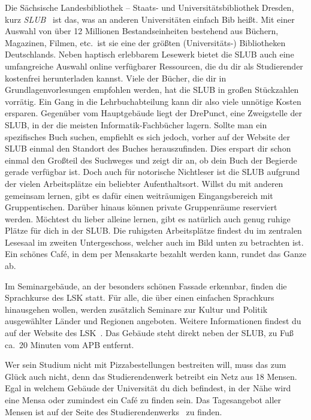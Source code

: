 \label{sec:slub}
Die Sächsische Landesbibliothek – Staats- und Universitätsbibliothek Dresden, kurz \emph{SLUB}~ ist das, was an anderen Universitäten einfach Bib heißt.
Mit einer Auswahl von über 12 Millionen Bestandseinheiten bestehend aus Büchern, Magazinen, Filmen, etc.\ ist sie eine der größten (Universitäts-) Bibliotheken Deutschlands.
Neben haptisch erlebbarem Lesewerk bietet die SLUB auch eine umfangreiche Auswahl online verfügbarer Ressourcen, die du dir als Studierender kostenfrei herunterladen kannst.
Viele der Bücher, die dir in Grundlagenvorlesungen empfohlen werden, hat die SLUB in großen Stückzahlen vorrätig. Ein Gang in die Lehrbuchabteilung kann dir also viele unnötige Kosten ersparen.
Gegenüber vom Hauptgebäude liegt der DrePunct, eine Zweigstelle der SLUB, in der die meisten Informatik-Fachbücher lagern. Sollte man ein spezifisches Buch suchen, empfiehlt es sich jedoch, vorher auf der Website der
SLUB einmal den Standort des Buches herauszufinden. Dies erspart dir schon einmal den Großteil des Suchweges und zeigt dir an, ob dein Buch der Begierde gerade verfügbar ist.\newline
Doch auch für notorische Nichtleser ist die SLUB aufgrund der vielen Arbeitsplätze ein beliebter Aufenthaltsort.
Willst du mit anderen gemeinsam lernen, gibt es dafür einen weiträumigen Eingangsbereich mit Gruppentischen.
Darüber hinaus können private Gruppenräume reserviert werden. Möchtest du lieber alleine lernen, gibt es natürlich auch genug ruhige Plätze für dich in der SLUB\@. Die ruhigsten Arbeitsplätze findest du im zentralen Lesesaal
im zweiten Untergeschoss, welcher auch im Bild unten zu betrachten ist. Ein schönes Café, in dem per Mensakarte bezahlt werden kann, rundet das Ganze ab.

\newpage
{}
Im Seminargebäude, an der besonders schönen Fassade erkennbar, finden die Sprachkurse des LSK statt.
Für alle, die über einen einfachen Sprachkurs hinausgehen wollen, werden zusätzlich Seminare zur Kultur und Politik ausgewählter Länder und Regionen angeboten.
Weitere Informationen findest du auf der Website des LSK~.
Das Gebäude steht direkt neben der SLUB, zu Fuß ca.\ 20 Minuten vom APB entfernt.

Wer sein Studium nicht mit Pizzabestellungen bestreiten will, muss das zum Glück auch nicht, denn das Studierendenwerk betreibt ein Netz aus 18 Mensen.
Egal in welchem Gebäude der Universität du dich befindest, in der Nähe wird eine Mensa oder zumindest ein Café zu finden sein.
Das Tagesangebot aller Mensen ist auf der Seite des Studierendenwerks~ zu finden.

